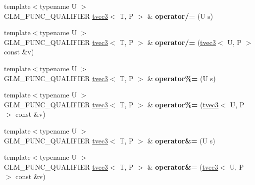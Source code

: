 \begin{DoxyCompactItemize}
\item 
{\footnotesize template$<$typename U $>$ }\\G\+L\+M\+\_\+\+F\+U\+N\+C\+\_\+\+Q\+U\+A\+L\+I\+F\+I\+ER \hyperlink{structglm_1_1detail_1_1tvec3}{tvec3}$<$ T, P $>$ \& {\bfseries operator/=} (U s)\hypertarget{structglm_1_1detail_1_1tvec3_af3e883a1150dc47126e797bd912c20a4}{}\label{structglm_1_1detail_1_1tvec3_af3e883a1150dc47126e797bd912c20a4}

\item 
{\footnotesize template$<$typename U $>$ }\\G\+L\+M\+\_\+\+F\+U\+N\+C\+\_\+\+Q\+U\+A\+L\+I\+F\+I\+ER \hyperlink{structglm_1_1detail_1_1tvec3}{tvec3}$<$ T, P $>$ \& {\bfseries operator/=} (\hyperlink{structglm_1_1detail_1_1tvec3}{tvec3}$<$ U, P $>$ const \&v)\hypertarget{structglm_1_1detail_1_1tvec3_aa8a3e4ddca435bf79743f2eaf7565258}{}\label{structglm_1_1detail_1_1tvec3_aa8a3e4ddca435bf79743f2eaf7565258}

\item 
{\footnotesize template$<$typename U $>$ }\\G\+L\+M\+\_\+\+F\+U\+N\+C\+\_\+\+Q\+U\+A\+L\+I\+F\+I\+ER \hyperlink{structglm_1_1detail_1_1tvec3}{tvec3}$<$ T, P $>$ \& {\bfseries operator\%=} (U s)\hypertarget{structglm_1_1detail_1_1tvec3_aaaf69a6d0cf17237a58eeb07b594c9a7}{}\label{structglm_1_1detail_1_1tvec3_aaaf69a6d0cf17237a58eeb07b594c9a7}

\item 
{\footnotesize template$<$typename U $>$ }\\G\+L\+M\+\_\+\+F\+U\+N\+C\+\_\+\+Q\+U\+A\+L\+I\+F\+I\+ER \hyperlink{structglm_1_1detail_1_1tvec3}{tvec3}$<$ T, P $>$ \& {\bfseries operator\%=} (\hyperlink{structglm_1_1detail_1_1tvec3}{tvec3}$<$ U, P $>$ const \&v)\hypertarget{structglm_1_1detail_1_1tvec3_aa8a52f5d1ee2dc56c4b62f70408d9c5f}{}\label{structglm_1_1detail_1_1tvec3_aa8a52f5d1ee2dc56c4b62f70408d9c5f}

\item 
{\footnotesize template$<$typename U $>$ }\\G\+L\+M\+\_\+\+F\+U\+N\+C\+\_\+\+Q\+U\+A\+L\+I\+F\+I\+ER \hyperlink{structglm_1_1detail_1_1tvec3}{tvec3}$<$ T, P $>$ \& {\bfseries operator\&=} (U s)\hypertarget{structglm_1_1detail_1_1tvec3_a0e63f52ae42a99bd67153078e5fd7e95}{}\label{structglm_1_1detail_1_1tvec3_a0e63f52ae42a99bd67153078e5fd7e95}

\item 
{\footnotesize template$<$typename U $>$ }\\G\+L\+M\+\_\+\+F\+U\+N\+C\+\_\+\+Q\+U\+A\+L\+I\+F\+I\+ER \hyperlink{structglm_1_1detail_1_1tvec3}{tvec3}$<$ T, P $>$ \& {\bfseries operator\&=} (\hyperlink{structglm_1_1detail_1_1tvec3}{tvec3}$<$ U, P $>$ const \&v)\hypertarget{structglm_1_1detail_1_1tvec3_ab7fe55bda5ac440876683f971c38e265}{}\label{structglm_1_1detail_1_1tvec3_ab7fe55bda5ac440876683f971c38e265}


\end{DoxyCompactItemize}
